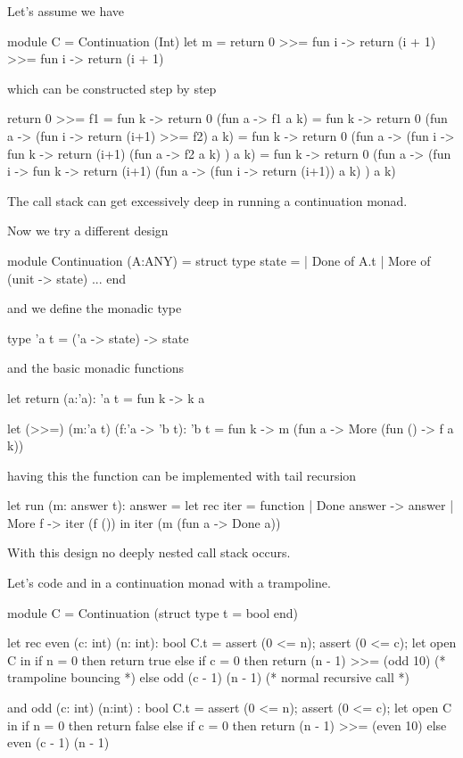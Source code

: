 Let's assume we have
\begin{ocaml}
   module C = Continuation (Int)
   let m = return 0 >>= fun i -> return (i + 1) >>= fun i -> return (i + 1)
\end{ocaml}
%
which can be constructed step by step
\begin{ocaml}
  return 0 >>= f1
  =
  fun k -> return 0 (fun a -> f1 a k)
  =
  fun k -> return 0 (fun a -> (fun i -> return (i+1) >>= f2) a k)
  =
  fun k -> return
             0
             (fun a -> (fun i ->
                          fun k ->
                            return
                              (i+1)
                              (fun a -> f2 a k)
                       ) a k)
  =
  fun k -> return
             0
             (fun a -> (fun i ->
                          fun k ->
                            return
                              (i+1)
                              (fun a -> (fun i -> return (i+1)) a k)
                       ) a k)
\end{ocaml}
%
The call stack can get excessively deep in running a continuation monad.

Now we try a different design
%
\begin{ocaml}
    module Continuation (A:ANY) =
    struct
        type state =
          | Done of A.t
          | More of (unit -> state)
        ...
    end
\end{ocaml}
%
and we define the monadic type
\begin{ocaml}
    type 'a t = ('a -> state) -> state
\end{ocaml}
%
and the basic monadic functions
\begin{ocaml}
     let return (a:'a): 'a t =
         fun k -> k a

     let (>>=) (m:'a t) (f:'a -> 'b t): 'b t =
         fun k ->
         m (fun a -> More (fun () -> f a k))
\end{ocaml}
%
having this the function  can be implemented with tail recursion
\begin{ocaml}
    let run (m: answer t): answer =
        let rec iter = function
            | Done answer ->
                answer
            | More f ->
                iter (f ())
        in
        iter (m (fun a -> Done a))
\end{ocaml}
%
With this design no deeply nested call stack occurs.

Let's code  and  in a continuation monad with a trampoline.

\begin{ocaml}
module C = Continuation (struct type t = bool end)

let rec even (c: int) (n: int): bool C.t =
    assert (0 <= n);
    assert (0 <= c);
    let open C in
    if n = 0 then
        return true
    else if c = 0 then
        return (n - 1) >>= (odd 10) (* trampoline bouncing *)
    else
        odd (c - 1) (n - 1)         (* normal recursive call *)

and odd (c: int) (n:int) : bool C.t =
    assert (0 <= n);
    assert (0 <= c);
    let open C in
    if n = 0 then
        return false
    else if c = 0 then
        return (n - 1) >>= (even 10)
    else
        even (c - 1) (n - 1)
\end{ocaml}

